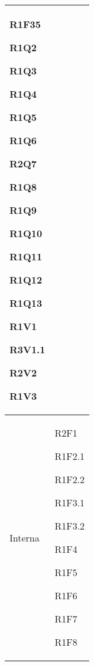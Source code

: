 \begin{center}
\begin{longtable}{|p{44mm}|p{22mm}|}
R1F35 \newline

R1Q2 \newline

R1Q3 \newline

R1Q4 \newline

R1Q5 \newline

R1Q6 \newline

R2Q7 \newline

R1Q8 \newline

R1Q9 \newline

R1Q10 \newline

R1Q11 \newline

R1Q12 \newline

R1Q13 \newline

 R1V1 \newline

R3V1.1 \newline

R2V2 \newline

R1V3
\\
\hline

\hline
Interna &

 R2F1 \newline

R1F2.1 \newline

R1F2.2 \newline

R1F3.1 \newline

R1F3.2 \newline

R1F4 \newline

R1F5 \newline

R1F6 \newline

R1F7 \newline

R1F8 \newline


\end{longtable}
\end{center}
